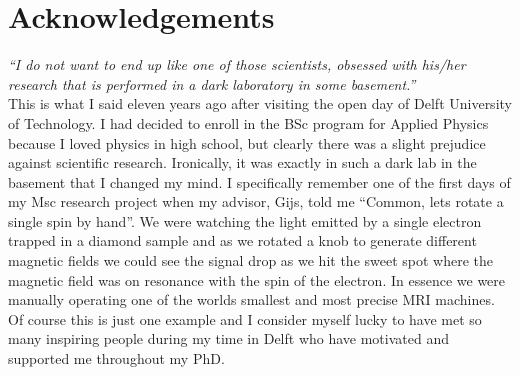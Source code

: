 \documentclass{report}
\begin{document}
\chapter{Acknowledgements}

\textit{``I do not want to end up like one of those scientists, obsessed with his/her research that is performed in a dark laboratory in some basement.''}
\\

This is what I said eleven years ago after visiting the open day of Delft University of Technology. I had decided to enroll in the BSc program for Applied Physics because I loved physics in high school, but clearly there was a slight prejudice against scientific research. Ironically, it was exactly in such a dark lab in the basement that I changed my mind. I specifically remember one of the first days of my Msc research project when my advisor, Gijs, told me  ``Common, lets rotate a single spin by hand''. We were watching the light emitted by a single electron trapped in a diamond sample and as we rotated a knob to generate different magnetic fields we could see the signal drop as we hit the sweet spot where the magnetic field was on resonance with the spin of the electron. In essence we were manually operating one of the worlds smallest and most precise MRI machines.
Of course this is just one example and I consider myself lucky to have met so many inspiring people during my time in Delft who have motivated and supported me throughout my PhD.\\
\end{document}
